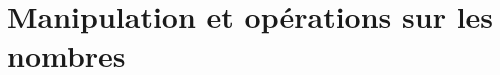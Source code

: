 \documentclass[french,xcolor=svgnames]{beamer}
\begin{document}

\section{Manipulation et opérations sur les nombres}
\end{document}
